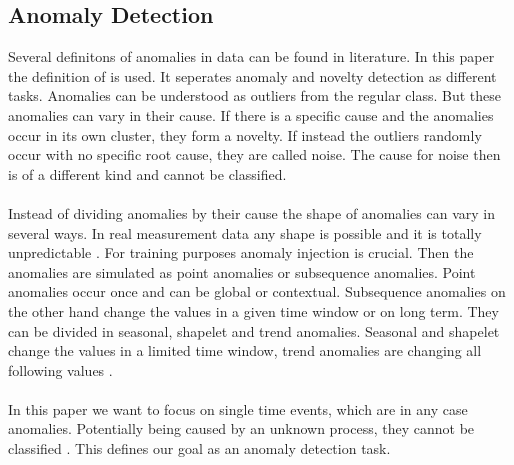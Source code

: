 \subsection{Anomaly Detection}
Several definitons of anomalies in data can be found in literature. In this paper the definition of  is used. It seperates anomaly and novelty detection as different tasks. Anomalies can be understood as outliers from the regular class. But these anomalies can vary in their cause. If there is a specific cause and the anomalies occur in its own cluster, they form a novelty. If instead the outliers randomly occur with no specific root cause, they are called noise. The cause for noise then is of a different kind and cannot be classified.\\\\
Instead of dividing anomalies by their cause the shape of anomalies can vary in several ways. In real measurement data any shape is possible and it is totally unpredictable \cite{schwartz_maeday_2024}. For training purposes anomaly injection is crucial. Then the anomalies are simulated as point anomalies or subsequence anomalies. Point anomalies occur once and can be global or contextual. Subsequence anomalies on the other hand change the values in a given time window or on long term. They can be divided in seasonal, shapelet and trend anomalies. Seasonal and shapelet change the values in a limited time window, trend anomalies are changing all following values \cite[p. 9]{darban_carla_2024}.\\\\ %
In this paper we want to focus on single time events, which are in any case anomalies. Potentially being caused by an unknown process, they cannot be classified \cite{gruhl_novelty_2022}. This defines our goal as an anomaly detection task.

